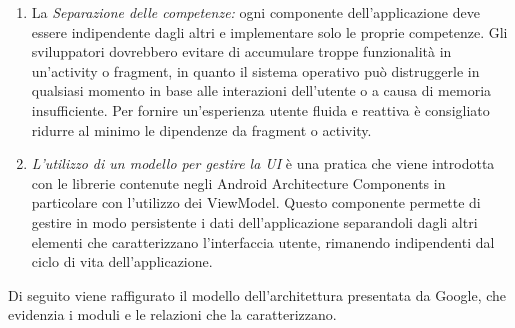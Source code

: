\documentclass[12pt]{report}
\begin{document}

\begin{enumerate}[label=\arabic*)]
	\item La \textit{Separazione delle competenze:} ogni componente dell'applicazione deve essere indipendente dagli altri e implementare solo le proprie competenze. Gli sviluppatori dovrebbero evitare di accumulare troppe funzionalità in un'activity o fragment, in quanto il sistema operativo può distruggerle in qualsiasi momento in base alle interazioni dell'utente o a causa di memoria insufficiente. Per fornire un'esperienza utente fluida e reattiva è consigliato ridurre al minimo le dipendenze da fragment o activity.
	\item \textit{L'utilizzo di un modello per gestire la UI} è una pratica che viene introdotta con le librerie contenute negli Android Architecture Components in particolare con l'utilizzo dei ViewModel. Questo componente permette di gestire in modo persistente i dati dell'applicazione separandoli dagli altri elementi che caratterizzano l'interfaccia utente, rimanendo indipendenti dal ciclo di vita dell'applicazione.
\end{enumerate}
Di seguito viene raffigurato il modello dell'architettura presentata da Google, che evidenzia i moduli e le relazioni che la caratterizzano.
\newpage
\end{document}
